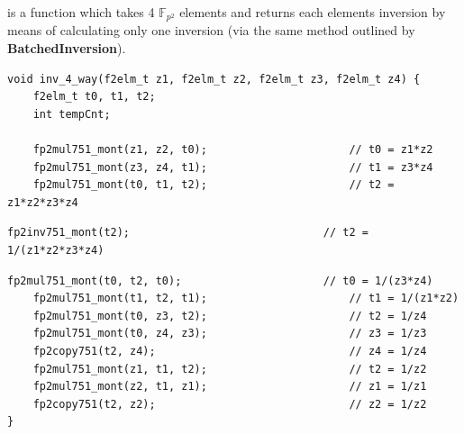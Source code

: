 \noindent
{} is a function which takes 4 $\mathbb{F}_{p^2}$ elements and returns each elements inversion by means of calculating only one inversion (via the same method outlined by \textbf{BatchedInversion}).

\begin{lstlisting}
void inv_4_way(f2elm_t z1, f2elm_t z2, f2elm_t z3, f2elm_t z4) {
  	f2elm_t t0, t1, t2;
	int tempCnt;

    fp2mul751_mont(z1, z2, t0);                      // t0 = z1*z2
    fp2mul751_mont(z3, z4, t1);                      // t1 = z3*z4
    fp2mul751_mont(t0, t1, t2);                      // t2 = z1*z2*z3*z4
\end{lstlisting}
\vspace{-\baselineskip}
\begin{lstlisting}[backgroundcolor=\color{light-red}, firstnumber=8]
    fp2inv751_mont(t2);                              // t2 = 1/(z1*z2*z3*z4)
\end{lstlisting}
\vspace{-\baselineskip}
\begin{lstlisting}[firstnumber=9]
    fp2mul751_mont(t0, t2, t0);                      // t0 = 1/(z3*z4) 
    fp2mul751_mont(t1, t2, t1);                      // t1 = 1/(z1*z2) 
    fp2mul751_mont(t0, z3, t2);                      // t2 = 1/z4
    fp2mul751_mont(t0, z4, z3);                      // z3 = 1/z3
    fp2copy751(t2, z4);                              // z4 = 1/z4
    fp2mul751_mont(z1, t1, t2);                      // t2 = 1/z2
    fp2mul751_mont(z2, t1, z1);                      // z1 = 1/z1
    fp2copy751(t2, z2);                              // z2 = 1/z2
}
\end{lstlisting}


